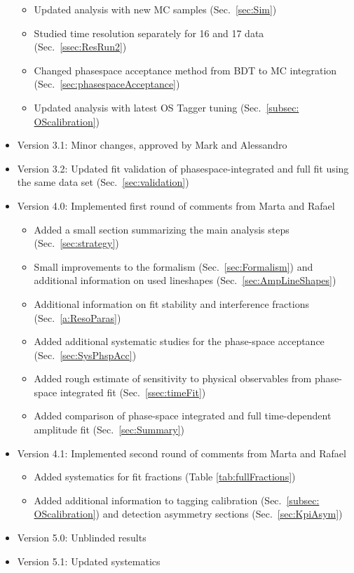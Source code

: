 \begin{itemize}
\begin{itemize}
		\item Updated analysis with new MC samples   (Sec.~\ref{sec:Sim})
	
		\item Studied time resolution separately for 16 and 17 data (Sec.~\ref{ssec:ResRun2}) 		
		
		\item Changed phasespace acceptance method from BDT to MC integration (Sec.~\ref{sec:phasespaceAcceptance}) 

		\item Updated analysis with latest OS Tagger tuning   (Sec.~\ref{subsec: OScalibration}) 		
		
	\end{itemize}
	
	\item Version 3.1:   Minor changes, approved by Mark and  Alessandro

	\item Version 3.2:   Updated fit validation of phasespace-integrated and full fit using the same data set (Sec.~\ref{sec:validation})

	\item Version 4.0:   Implemented first round of comments from Marta and Rafael
	\begin{itemize}
		\item Added a small section summarizing the main analysis steps (Sec.~\ref{sec:strategy})
		\item Small improvements to the formalism (Sec.~\ref{sec:Formalism}) and additional information on used lineshapes (Sec.~\ref{sec:AmpLineShapes})
		\item Additional information on fit stability and interference fractions (Sec.~\ref{a:ResoParas})
		\item Added additional systematic studies for the phase-space acceptance (Sec.~\ref{sec:SysPhspAcc})
		\item Added rough estimate of sensitivity to physical observables from phase-space integrated fit  (Sec.~\ref{ssec:timeFit})
		\item Added comparison of phase-space integrated and full time-dependent amplitude fit (Sec.~\ref{sec:Summary})
	\end{itemize}
	
		\item Version 4.1:   Implemented second round of comments from Marta and Rafael
	\begin{itemize}
		\item Added systematics for fit fractions (Table \ref{tab:fullFractions})
		\item Added additional information to tagging calibration (Sec.~\ref{subsec: OScalibration}) and detection asymmetry sections (Sec.~\ref{sec:KpiAsym})
	\end{itemize}
	
			\item Version 5.0:  Unblinded results 
			
			\item Version 5.1:  Updated systematics 



\end{itemize}
